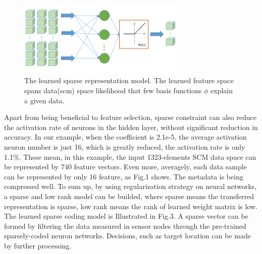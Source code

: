 
\begin{figure}
\includegraphics[width=8cm]{figure/sparse_represention_model}
\caption{The learned sparse representation model. The learned feature space spans data(scm) space likelihood that few basis functions $\phi$ explain a given data.}
\end{figure}

Apart from being beneficial to feature selection, sparse constraint can also reduce the activation rate of neurons in the hidden layer, without significant reduction in accuracy. In our example, when the coefficient is 2.1e-5, the average activation neuron number is just 16, which is greatly reduced, the activation rate is only 1.1{\%}.
These mean, in this example, the input 1323-elements SCM  data space can be represented by 740 feature vectors. Even more, averagely, each data sample can be represented by only 16 feature, as Fig.1 shows. The metadata is being compressed well. To sum up, by using regularization strategy on neural networks, a sparse and low rank model can be builded, where sparse means the transferred representation is sparse, low rank means the rank of learned weight matrix is low. The learned sparse coding model is Illustrated in Fig.3.
A sparse vector can be formed by filtering the data measured in sensor nodes through the pre-trained sparsely-coded neuron networks. Decisions, such as target location can be made by further processing.

